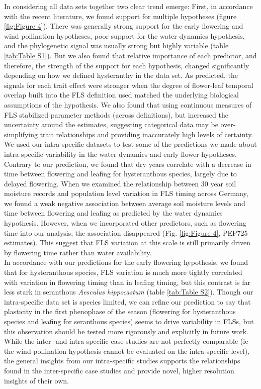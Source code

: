 \documentclass[12pt]{article}
\begin{document}
\indent In considering all data sets together two clear trend emerge: First, in accordance with the recent literature, we found support for multiple hypotheses (figure \ref{fig:Figure 4}). There was generally strong support for the early flowering and wind pollination hypotheses, poor support for the water dynamics hypothesis, and the phylogenetic signal was usually strong but highly variable (table \ref{tab:Table S1}). But we also found that relative importance of each predictor, and therefore, the strength of the support for each hypothesis, changed significantly depending on how we defined hysteranthy in the data set. As predicted, the signals for each trait effect were stronger when the degree of flower-leaf temporal overlap built into the FLS definition used matched the underlying biological assumptions of the hypothesis. We also found that using continuous measures of FLS stabilized parameter methods (across definitions), but increased the uncertainty around the estimates, suggesting categorical data may be over-simplifying trait relationships and providing inaccurately high levels of certainty.\\

\indent We used our intra-specific datasets to test some of the predictions we made about intra-specific variability in the water dynamics and early flower hypotheses. Contrary to our prediction, we found that dry years correlate with a decrease in time between flowering and leafing for hysteranthous species, largely due to delayed flowering. When we examined the relationship between 30 year soil moisture records \citep{DWD} and population level variation in FLS timing across Germany, we found a weak negative association between average soil moisture levels and time between flowering and leafing as predicted by the water dynamics hypothesis. However, when we incorporated other predictors, such as flowering time into our analysis, the association disappeared (Fig. \ref{fig:Figure 4}, PEP725 estimates). This suggest that FLS variation at this scale is still primarily driven by flowering time rather than water availability. \\ 

\indent In accordance with our predictions for the early flowering hypothesis, we found that for hysteranthous species, FLS variation is much more tightly correlated with variation in flowering timing than in leafing timing, but this contrast is far less stark in seranthous \textit{Aesculus hippocastum} (table \ref{tab:Table S2}). Though our intra-specific data set is species limited, we can refine our prediction to say that plasticity in the first phenophase of the season (flowering for hysteranthous species and leafing for seranthous species) seems to drive variability in FLSs, but this observation should be tested more rigorously and explicitly in future work. While the inter- and intra-specific case studies are not perfectly comparable (ie the wind pollination hypothesis cannot be evaluated on the intra-specific level), the general insights from our intra-specific studies supports the relationships found in the inter-specific case studies and provide novel, higher resolution insights of their own.
\end{document}

